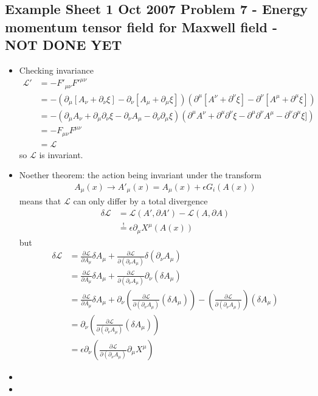 \documentclass[../main.tex]{subfiles}
\begin{document}
\subsection{Example Sheet 1 Oct 2007 Problem 7 - Energy momentum tensor  field for Maxwell field - NOT DONE YET}
\begin{itemize}
\item Checking invariance
\begin{align}
\mathcal{L}'&=-F'_{\mu\nu}F'^{\mu\nu}\\
&=-(\partial_\mu[A_\nu+\partial_\nu\xi]-\partial_\nu[A_\mu+\partial_\mu\xi])(\partial^\mu[A^\nu+\partial^\nu\xi]-\partial^\nu[A^\mu+\partial^\mu\xi])\\
&=-(\partial_\mu A_\nu+\partial_\mu\partial_\nu\xi-\partial_\nu A_\mu-\partial_\nu\partial_\mu\xi)
(\partial^\mu A^\nu+\partial^\mu\partial^\nu\xi-\partial^\mu\partial^\nu A^\mu-\partial^\nu\partial^\mu\xi])\\
&=-F_{\mu\nu}F^{\mu\nu}\\
&=\mathcal{L}
\end{align}
so $\mathcal{L}$ is invariant.
\item Noether theorem: the action being invariant under the transform
\begin{align}
A_\mu(x)\rightarrow A'_\mu(x)=A_\mu(x)+\epsilon G_i(A(x))
\end{align}
means that $\mathcal{L}$ can only differ by a total divergence
\begin{align}
\delta\mathcal{L}
&=\mathcal{L}(A',\partial A')-\mathcal{L}(A,\partial A)\\
&\overset{!}{=}\epsilon\partial_\mu X^\mu(A(x))
\end{align}
but
\begin{align}
\delta\mathcal{L}
&=\frac{\partial\mathcal{L}}{\partial A_\mu}\delta A_\mu+\frac{\partial\mathcal{L}}{\partial (\partial_\nu A_\mu)}\delta (\partial_\nu A_\mu)\\
&=\frac{\partial\mathcal{L}}{\partial A_\mu}\delta A_\mu+\frac{\partial\mathcal{L}}{\partial (\partial_\nu A_\mu)} \partial_\nu (\delta A_\mu)\\
&=\frac{\partial\mathcal{L}}{\partial A_\mu}\delta A_\mu+\partial_\nu
\left(\frac{\partial\mathcal{L}}{\partial (\partial_\nu A_\mu)}  (\delta A_\mu)\right)-\left(\frac{\partial\mathcal{L}}{\partial (\partial_\nu A_\mu)}\right)  (\delta A_\mu)\\
&=\partial_\nu\left(\frac{\partial\mathcal{L}}{\partial (\partial_\nu A_\mu)}  (\delta A_\mu)\right)\\
&=\epsilon\partial_\nu\left(\frac{\partial\mathcal{L}}{\partial (\partial_\nu A_\mu)}\partial_\mu X^\mu\right)
\end{align}
\item
\item
\end{itemize}
\end{document}
